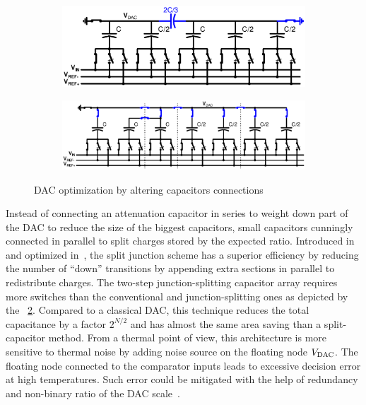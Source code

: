 \begin{figure}[htp]
	\centering
	\begin{subfigure}[b]{0.46\textwidth}
		\includegraphics[width=\textwidth]{Chapter3/Figs/sar_split_cap_dac.ps}
		\label{fig:split_capacitor}
	\end{subfigure}
	\begin{subfigure}[b]{0.52\textwidth}
		\includegraphics[width=\textwidth]{Chapter3/Figs/sar_split_junction_dac.ps}
		\label{fig:split_junction}
	\end{subfigure}
	\caption{DAC optimization by altering capacitors connections}
	\label{fig:sar_split_dac}
\end{figure}

Instead of connecting an attenuation capacitor in series to weight down part of the DAC to reduce the size of the biggest capacitors, small capacitors cunningly connected in parallel to split charges stored by the expected ratio. Introduced in~\cite{Lee2008} and optimized in~\cite{Yu2010}, the split junction scheme has a superior efficiency by reducing the number of ``down'' transitions by appending extra sections in parallel to redistribute charges. The two-step junction-splitting capacitor array requires more switches than the conventional and junction-splitting ones as depicted by the \figurename~\ref{fig:split_junction}. Compared to a classical DAC, this technique reduces the total capacitance by a factor \(2^{N/2}\) and has almost the same area saving than a split-capacitor method. From a thermal point of view, this architecture is more sensitive to thermal noise by adding noise source on the floating node \(V_{\rm DAC}\). The floating node connected to the comparator inputs leads to excessive decision error at high temperatures. Such error could be mitigated with the help of redundancy and non-binary ratio of the DAC scale~\cite{Zhang2014}.

